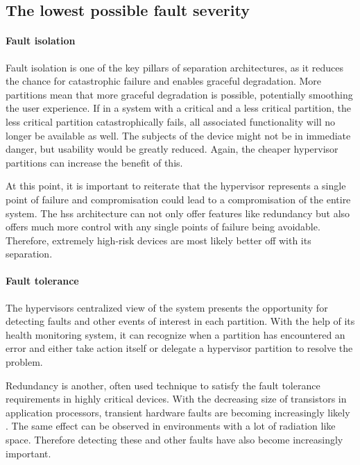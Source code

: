 \subsection{The lowest possible fault severity}
\paragraph{Fault isolation}
Fault isolation is one of the key pillars of separation architectures, as it reduces the chance for catastrophic failure and enables graceful degradation. More partitions mean that more graceful degradation is possible, potentially smoothing the user experience. If in a system with a critical and a less critical partition, the less critical partition catastrophically fails, all associated functionality will no longer be available as well. The subjects of the device might not be in immediate danger, but usability would be greatly reduced. Again, the cheaper hypervisor partitions can increase the benefit of this.

At this point, it is important to reiterate that the hypervisor represents a single point of failure and compromisation could lead to a compromisation of the entire system. The \acrshort{hss} architecture can not only offer features like redundancy but also offers much more control with any single points of failure being avoidable. Therefore, extremely high-risk devices are most likely better off with its separation.

\paragraph{Fault tolerance}
The hypervisors centralized view of the system presents the opportunity for detecting faults and other events of interest in each partition. With the help of its health monitoring system, it can recognize when a partition has encountered an error and either take action itself or delegate a hypervisor partition to resolve the problem.

Redundancy is another, often used technique to satisfy the fault tolerance requirements in highly critical devices. With the decreasing size of transistors in application processors, transient hardware faults are becoming increasingly likely \cite{constantinescu2003trends}. The same effect can be observed in environments with a lot of radiation like space.
Therefore detecting these and other faults have also become increasingly important.

